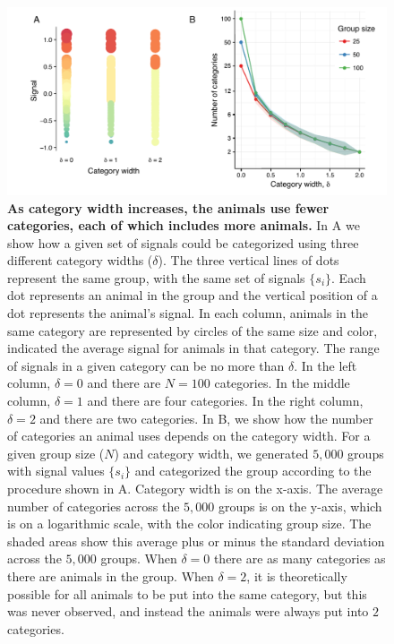 \begin{figure}[ht]
\includegraphics[width=6.85in]{figures/category_diagram.pdf}
\caption{\sffamily\small\textbf{As category width increases, the animals use fewer categories, each of which includes more animals.} 
In A we show how a given set of signals could be categorized using three different category widths ($\delta$). The three vertical lines of dots represent the same group, with the same set of signals $\{s_i\}$. Each dot represents an animal in the group and the vertical position of a dot represents the animal's signal. In each column, animals in the same category are represented by circles of the same size and color, indicated the average signal for animals in that category. The range of signals in a given category can be no more than $\delta$. In the left column, $\delta=0$ and there are $N=100$ categories. In the middle column, $\delta=1$ and there are four categories. In the right column, $\delta=2$ and there are two categories.  In B, we show how the number of categories an animal uses depends on the category width. For a given group size ($N$) and category width, we generated $5,000$ groups with signal values $\{s_i\}$ and categorized the group according to the procedure shown in A.  Category width is on the x-axis. The average number of categories across the $5,000$ groups is on the y-axis, which is on a logarithmic scale, with the color indicating group size. The shaded areas show this average plus or minus the standard deviation across the $5,000$ groups. When $\delta=0$ there are as many categories as there are animals in the group. When $\delta=2$, it is theoretically possible for all animals to be put into the same category, but this was never observed, and instead the animals were always put into $2$ categories. }
 \label{category_diagram}
\end{figure}


